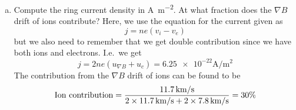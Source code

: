 \begin{enumerate}
\begin{enumerate}[(a)]
        Calculate the ion and electron \(\nabla B\) and curvature drifts. In what direction is the ring current encircling the Earth? Justify your answer.
        \mylinbrk{}
        Since the energy is said to be isotropic, we know that \(mv_{||}^2/2=\SI{30}{\kilo\electronvolt}\) and \(mv_\perp^2=\SI{60}{\kilo\electronvolt}\). We also need to find the gradient of the magnetic field in the radial direction. Since it decreases as \(1/r^3\) we get
        \begin{equation*}
            \p{r}{B}=-\frac{-3C}{r^4}
        \end{equation*}
        where \(C\) is a constant given as
        \begin{equation*}
            B(R_E)=\frac{C}{R_E^3}=\num{3e-5}\si{\tesla}\Rightarrow C=\num{7.86e15}\si{\tesla\metre^3}
        \end{equation*}
        The velocity due to \(\nabla B\) will be
        \begin{equation*}
            u_{\nabla B}=\frac{1}{2}mv_\perp^2\frac{1}{q}\frac{\nabla B}{B^2}=\frac{1}{2}mv_\perp^2\frac{3C}{r^4}\frac{r^6}{C^2}\approx\SI{11.7}{\kilo\metre/\second}
        \end{equation*}
        For the curvature drift, we get
        \begin{equation*}
            u_c=\frac{mv_{||}^2}{qB}\frac{B}{R_c}\approx\SI{7.8}{\kilo\metre/\second}
        \end{equation*}
        \item Compute the ring current density in \si{\ampere\metre^{-2}}. At what fraction does the \(\nabla B\) drift of ions contribute?
        \mylinbrk{}
        Here, we use the equation for the current given as
        \begin{equation*}
            j=ne\left(v_i-v_e\right)
        \end{equation*}
        but we also need to remember that we get double contribution since we have both ions and electrons. I.e.\ we get
        \begin{equation*}
            j=2ne\left(u_{\nabla B}+u_c\right)=\num{6.25e-22}\si{\ampere/\metre^2}
        \end{equation*}
        The contribution from the \(\nabla B\) drift of ions can be found to be
        \begin{equation*}
            \textnormal{Ion contribution}=\frac{\SI{11.7}{\kilo\metre/\second}}{2\times\SI{11.7}{\kilo\metre/\second}+2\times\SI{7.8}{\kilo\metre/\second}}=30\%
        \end{equation*}
    \end{enumerate}
    \begin{figure}[t]
        \centering


\end{figure}
\end{enumerate}
